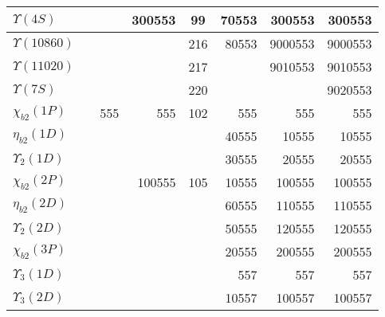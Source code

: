 \begin{tabular}{|l@{\tstrut}|r|r|r|c|r|r|r|}
$\Upsilon(4S)$                 &     &         & 300553 &  99 &  70553 &  300553 & 300553 \\ \hline
$\Upsilon(10860)$              &     &         &        & 216 &  80553 & 9000553 & 9000553 \\ \hline
$\Upsilon(11020)$              &     &         &        & 217 &        & 9010553 & 9010553 \\ \hline
$\Upsilon(7S)$                 &     &         &        & 220 &        &         & 9020553 \\ \hline\hline
$\chi_{b2}(1P)$                &     &   555   &    555 & 102 &    555 &     555 & 555 \\ \hline
$\eta_{b2}(1D)$                &     &         &        &     &  40555 &   10555 & 10555 \\ \hline
$\Upsilon_2(1D)$               &     &         &        &     &  30555 &   20555 & 20555 \\ \hline
$\chi_{b2}(2P)$                &     &         & 100555 & 105 &  10555 &  100555 & 100555 \\ \hline
$\eta_{b2}(2D)$                &     &         &        &     &  60555 &  110555 & 110555 \\ \hline
$\Upsilon_2(2D)$               &     &         &        &     &  50555 &  120555 & 120555 \\ \hline
$\chi_{b2}(3P)$                &     &         &        &     &  20555 &  200555 & 200555 \\ \hline\hline
$\Upsilon_3(1D)$               &     &         &        &     &    557 &     557 & 557 \\ \hline
$\Upsilon_3(2D)$               &     &         &        &     &  10557 &  100557 & 100557 \\ \hline
\end{tabular}

